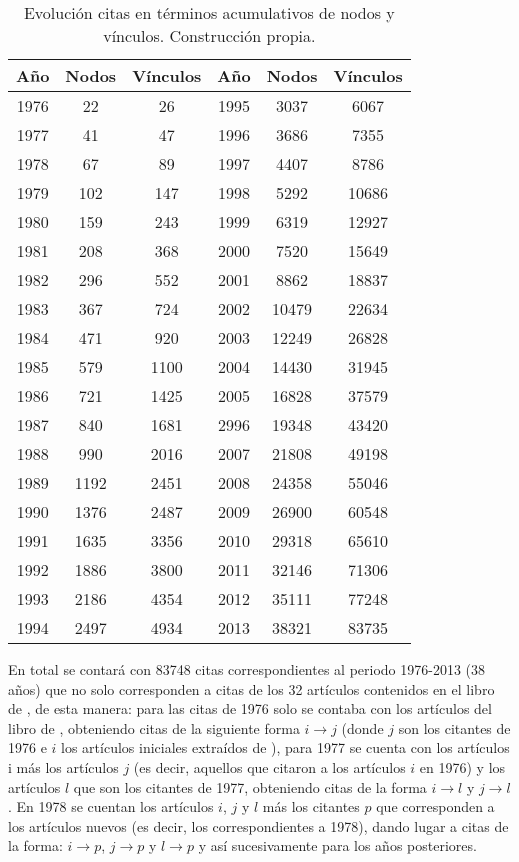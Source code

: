 \documentclass[12pt,letter]{article}
\begin{document}
\vspace{0.5cm}

\begin{table}[h!]
\centering
\resizebox{10cm}{!} {
\begin{tabular}{cccccc}
Año & Nodos & Vínculos & Año & Nodos & Vínculos\\ \hline 
1976 & 22   & 26   & 1995   &  3037  & 6067 \\
1977 & 41   &  47   & 1996  &   3686 & 7355 \\
1978 & 67   & 89    & 1997  &  4407  & 8786  \\
1979 & 102 & 147  & 1998  & 5292   & 10686 \\
1980 & 159 & 243  & 1999  & 6319   & 12927\\
1981 & 208 & 368  & 2000 & 7520    & 15649\\
1982 & 296 & 552 &  2001 & 8862    & 18837 \\
1983 & 367 & 724  & 2002 & 10479  & 22634\\
1984 & 471 & 920  & 2003 & 12249  & 26828\\
1985 &579  & 1100 & 2004 & 14430 & 31945\\
1986 & 721 & 1425 & 2005 & 16828 & 37579\\
1987 & 840 & 1681 & 2996 & 19348 & 43420\\
1988 & 990 & 2016 & 2007 & 21808 & 49198\\
1989 & 1192 & 2451 & 2008 & 24358 & 55046\\
1990 & 1376 & 2487 & 2009 & 26900 & 60548\\
1991 & 1635 & 3356 & 2010 & 29318 & 65610\\ 
1992 & 1886 & 3800 & 2011 & 32146 & 71306\\
1993 & 2186 & 4354 & 2012 & 35111 & 77248\\
1994 &  2497 & 4934 & 2013  & 38321 & 83735 \\ \hline
\end{tabular}}
\caption{\small{Evolución citas en términos acumulativos de nodos y vínculos. Construcción propia.}}
\label{c3}
\end{table}

\vspace{0.5cm}
En total se contará con 83748 citas correspondientes al periodo 1976-2013 (38 años) que no solo corresponden a citas de los 32 artículos contenidos en el libro de \citep{Lucas2}, de esta manera: para las citas de 1976 solo se contaba con los artículos del libro de \cite{Lucas2}, obteniendo citas de la siguiente forma $i\rightarrow j$ (donde $j$ son los citantes de 1976 e $i$ los artículos iniciales extraídos de \citep{Lucas2}), para 1977 se cuenta con los artículos i más los artículos $j$ (es decir, aquellos que citaron a los artículos $i$ en 1976) y los artículos $l$ que son los citantes de 1977, obteniendo citas de la forma $i\rightarrow l$ y $j\rightarrow l$. En 1978 se cuentan los artículos $i$, $j$ y $l$ más los citantes $p$ que corresponden a los artículos nuevos (es decir, los correspondientes a 1978), dando lugar a citas de la forma: $i\rightarrow p$, $j\rightarrow p$ y $l \rightarrow p$ y así sucesivamente para los años posteriores.
\end{document}
